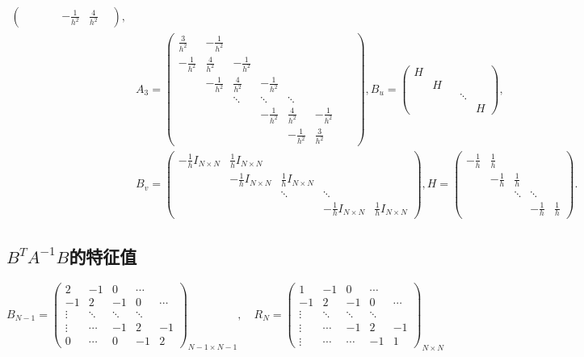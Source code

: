 \documentclass{article}
\begin{document}
\begin{equation*}
\begin{aligned}
\begin{pmatrix}
    & & & & -\frac{1}{h^2} & \frac{4}{h^2} & 
    \end{pmatrix}, \\
    & A_3=
    \begin{pmatrix}
    \frac{3}{h^2} & -\frac{1}{h^2} & & & & & & \\
    -\frac{1}{h^2} & \frac{4}{h^2} & -\frac{1}{h^2} & & & & & \\
    & -\frac{1}{h^2} & \frac{4}{h^2} & -\frac{1}{h^2} & & & & \\
    & & \ddots & \ddots & \ddots & & \\
    & & & -\frac{1}{h^2} & \frac{4}{h^2} & -\frac{1}{h^2} & \\
    & & & & -\frac{1}{h^2} & \frac{3}{h^2} & 
    \end{pmatrix},B_u=
    \begin{pmatrix}
    H & & & & \\
    & H & & & \\
    & & & \ddots & \\
    & & & & H
    \end{pmatrix}, \\
    & B_{v}=
    \begin{pmatrix}
    -\frac{1}{h}I_{N\times N} & \frac{1}{h}I_{N\times N} \\
    & -\frac{1}{h}I_{N\times N} & \frac{1}{h}I_{N\times N} \\
    & & \ddots & \ddots \\
    & & & -\frac{1}{h}I_{N\times N} & \frac{1}{h}I_{N\times N}
    \end{pmatrix},H=
    \begin{pmatrix}
    -\frac{1}{h} & \frac{1}{h} \\
    & -\frac{1}{h} & \frac{1}{h} \\
    & & \ddots & \ddots \\
    & & & -\frac{1}{h} & \frac{1}{h}
    \end{pmatrix}.
  \end{aligned}
\end{equation*}

\subsection{$B^TA^{-1}B$的特征值}

\[
B_{N-1} = 
\begin{pmatrix}
2 & -1 & 0 & \cdots \\
-1 & 2 & -1 & 0 & \cdots \\
\vdots & \ddots & \ddots & \ddots \\
\vdots & \cdots & -1 & 2 & -1 \\
0 & \cdots & 0 & -1 & 2
\end{pmatrix}_{N-1 \times N-1}, \quad
R_N = 
\begin{pmatrix}
1 & -1 & 0 & \cdots \\
-1 & 2 & -1 & 0 & \cdots \\
\vdots & \ddots & \ddots & \ddots \\
\vdots & \cdots & -1 & 2 & -1 \\
\vdots & \cdots & \cdots & -1 & 1
\end{pmatrix}_{N \times N}
\]
\end{document}
